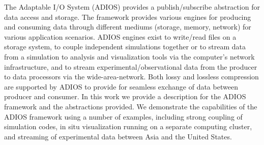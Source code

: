 The Adaptable I/O System (ADIOS) provides a publish/subscribe abstraction for data access and storage.
The framework provides various engines for producing and consuming data through different mediums (storage, memory, network) for various application scenarios.
ADIOS engines exist to write/read files on a storage system, to couple independent simulations together or to stream data from a simulation to analysis and visualization tools via the computer's network infrastructure, and to stream experimental/observational data from the producer to data processors via the wide-area-network.
Both lossy and lossless compression are supported by ADIOS to provide for seamless exchange of data between producer and consumer.
In this work we provide a description for the ADIOS framework and the abstractions provided.
We demonstrate the capabilities of the ADIOS framework using a number of examples, including strong coupling of simulation codes, in situ visualization running on a separate computing cluster, and streaming of experimental data between Asia and the United States.
